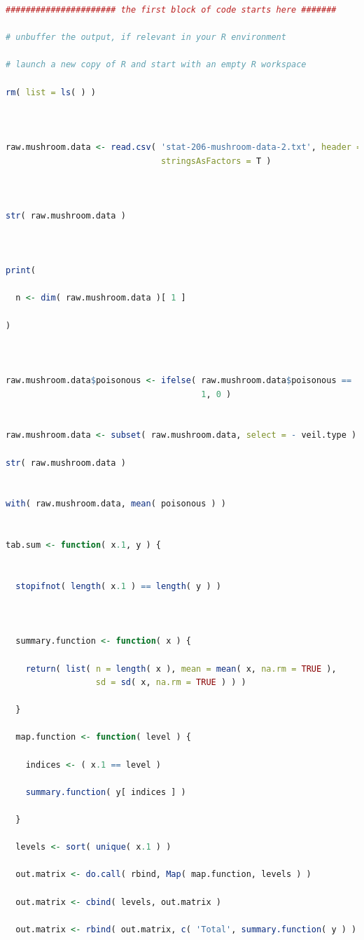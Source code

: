 \documentclass[12pt]{article}
\begin{document}
\begin{lstlisting}[language = R]
###################### the first block of code starts here #######

# unbuffer the output, if relevant in your R environment

# launch a new copy of R and start with an empty R workspace

rm( list = ls( ) )



raw.mushroom.data <- read.csv( 'stat-206-mushroom-data-2.txt', header = T,
                               stringsAsFactors = T )



str( raw.mushroom.data )



print( 
  
  n <- dim( raw.mushroom.data )[ 1 ] 
  
)



raw.mushroom.data$poisonous <- ifelse( raw.mushroom.data$poisonous == 'p',
                                       1, 0 )


raw.mushroom.data <- subset( raw.mushroom.data, select = - veil.type )

str( raw.mushroom.data )


with( raw.mushroom.data, mean( poisonous ) )


tab.sum <- function( x.1, y ) {
  
  
  stopifnot( length( x.1 ) == length( y ) )
  

  
  summary.function <- function( x ) {
    
    return( list( n = length( x ), mean = mean( x, na.rm = TRUE ), 
                  sd = sd( x, na.rm = TRUE ) ) )
    
  }
  
  map.function <- function( level ) {
    
    indices <- ( x.1 == level )
    
    summary.function( y[ indices ] )
    
  }
  
  levels <- sort( unique( x.1 ) )
  
  out.matrix <- do.call( rbind, Map( map.function, levels ) )
  
  out.matrix <- cbind( levels, out.matrix )
  
  out.matrix <- rbind( out.matrix, c( 'Total', summary.function( y ) ) )
  

\end{lstlisting}
\end{document}
